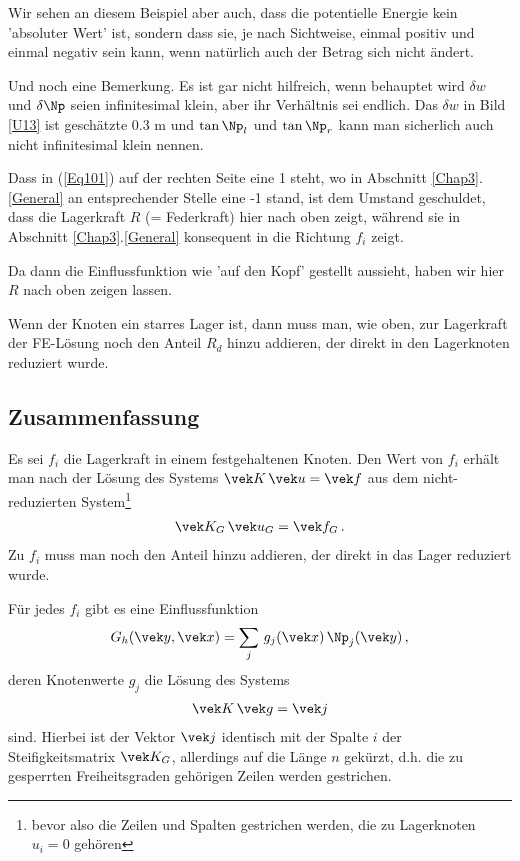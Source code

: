 {{{{Wir sehen an diesem Beispiel aber auch, dass die potentielle Energie kein 'absoluter Wert' ist, sondern dass sie, je nach Sichtweise, einmal positiv und einmal negativ sein kann, wenn nat\"{u}rlich auch der Betrag sich nicht \"{a}ndert.


Und noch eine Bemerkung. Es ist gar nicht hilfreich, wenn behauptet wird $\delta w$ und $\delta \Np$ seien infinitesimal klein, aber ihr Verh\"{a}ltnis sei endlich. Das $\delta w$  in Bild \ref{U13} ist gesch\"{a}tzte 0.3 m und $\tan \Np_l$ und $\tan \Np_r$ kann man sicherlich auch nicht infinitesimal klein nennen.
\\

\begin{remark}
Dass in (\ref{Eq101}) auf der rechten Seite eine 1 steht, wo in Abschnitt \ref{Chap3}.\ref{General} an entsprechender Stelle eine -1 stand, ist dem Umstand geschuldet, dass die Lagerkraft $R$ (= Federkraft) hier nach oben zeigt, w\"{a}hrend sie in Abschnitt \ref{Chap3}.\ref{General} konsequent in die Richtung $f_i$ zeigt.

Da dann die Einflussfunktion wie 'auf den Kopf' gestellt aussieht, haben wir hier $R$ nach oben zeigen lassen.\\
\end{remark}


Wenn der Knoten ein starres Lager ist, dann muss man, wie oben, zur Lagerkraft der FE-L\"{o}sung noch den Anteil $R_d$ hinzu addieren, der direkt in den Lagerknoten reduziert wurde.

{\textcolor{blau2}{\section{Zusammenfassung}}\label{Zusammenfassung}
Es sei $f_i$ die Lagerkraft in einem festgehaltenen Knoten. Den Wert von $f_i$ erh\"{a}lt man nach der L\"{o}sung des Systems $\vek K\,\vek u = \vek f$ aus dem nicht-reduzierten System\footnote{bevor also die Zeilen und Spalten gestrichen werden, die zu Lagerknoten $u_i = 0$ geh\"{o}ren}
\begin{align}
\vek K_G\,\vek u_G = \vek f_G\,.
\end{align}
Zu $f_i$ muss man noch den Anteil hinzu addieren, der direkt in das Lager reduziert wurde.

F\"{u}r jedes $f_i$ gibt es eine Einflussfunktion
\begin{align}
G_h(\vek y,\vek x) = \sum_j\,g_j(\vek x)\,\Np_j(\vek y)\,,
\end{align}
deren Knotenwerte $g_j$ die L\"{o}sung des Systems
\begin{align}
\vek K\,\vek g = \vek j
\end{align}
sind. Hierbei ist der Vektor $\vek j$ identisch mit der Spalte $i$ der Steifigkeitsmatrix $\vek K_G$, allerdings auf die L\"{a}nge $n$ gek\"{u}rzt, d.h. die zu gesperrten Freiheitsgraden geh\"{o}rigen Zeilen werden gestrichen.

}}}}}
